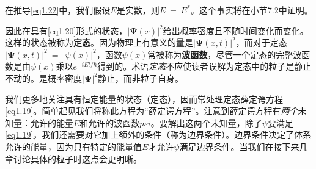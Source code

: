 \documentclass[12pt,a4paper,openany]{ctexbook}
\begin{document}
\begin{flushleft}
在推导\eqref{eq1.22}中，我们假设$E$是实数，则$E\ =\ E^*$。这个事实将在小节7.2中证明。

因此在具有\eqref{eq1.20}形式的状态，$\left|\bm{\Psi}(x)\right|^2$给出概率密度且不随时间变化而变化。这样的状态被称为\textbf{定态}。因为物理上有意义的量是$\left|\bm{\Psi}(x,t)\right|^2$，而对于定态$\left|\bm{\Psi}(x,t)\right|^2\ =\ \left|\psi(x)\right|^2$，函数$\psi(x)$常被称为\textbf{波函数}，尽管一个定态的完整波函数是由$\psi(x)$乘以$e^{-iEt/\hbar}$得到的。术语\textit{定态}不应使读者误解为定态中的粒子是静止不动的。是概率密度$\left|\bm{\Psi}\right|^2$静止，而非粒子自身。

我们更多地关注具有恒定能量的状态（定态），因而常处理定态薛定谔方程\eqref{eq1.19}。简单起见我们将称此方程为“薛定谔方程”。注意到薛定谔方程有\textit{两个}未知量：允许的能量$E$和允许的波函数$psi$。要解出这两个未知量，除了$\psi$要满足\eqref{eq1.19}，我们还需要对它加上额外的条件（称为边界条件）。边界条件决定了体系允许的能量，因为只有特定的能量值$E$才允许$\psi$满足边界条件。当我们在接下来几章讨论具体的粒子时这点会更明晰。
\end{flushleft}
\end{document}
